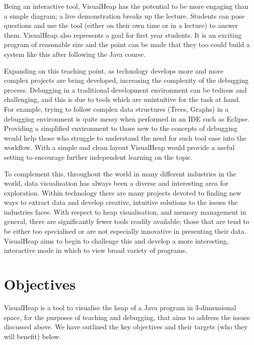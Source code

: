 \documentclass[11pt, a4paper]{report}
\begin{document}
Being an interactive tool, VisualHeap has the potential to be more engaging than a simple diagram; a live demonstration breaks up the lecture. Students can pose questions and use the tool (either on their own time or in a lecture) to answer them. VisualHeap also represents a goal for first year students. It is an exciting program of reasonable size and the point can be made that they too could build a system like this after following the Java course.

Expanding on this teaching point, as technology develops more and more complex projects are being developed, increasing the complexity of the debugging process. Debugging in a traditional development environment can be tedious and challenging, and this is due to tools which are unintuitive for the task at hand. For example, trying to follow complex data structures (Trees, Graphs) in a debugging environment is quite messy when performed in an IDE such as Eclipse. Providing a simplified environment to those new to the concepts of debugging would help those who struggle to understand the need for such tool ease into the workflow. With a simple and clean layout VisualHeap would provide a useful setting to encourage further independent learning on the topic. 

To complement this, throughout the world in many different industries in the world, data visualisation has always been a diverse and interesting area for exploration. Within technology there are many projects devoted to finding new ways to extract data and develop creative, intuitive solutions to the issues the industries faces. With respect to heap visualisation, and memory management in general, there are significantly fewer tools readily available; those that are tend to be either too specialised or are not especially innovative in presenting their data. VisualHeap aims to begin to challenge this and develop a more interesting, interactive mode in which to view broad variety of programs. 
\section{Objectives}

VisualHeap is a tool to visualise the heap of a Java program in 3-dimensional space, for the purposes of teaching and debugging, that aims to address the issues discussed above. We have  outlined the key objectives and their targets (who they will benefit) below.
\end{document}

